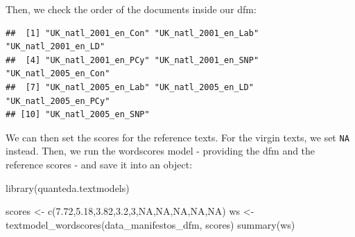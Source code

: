 \documentclass[
]{article}
\newenvironment{Shaded}{\begin{snugshade}}{\end{snugshade}}
\newcommand{\ConstantTok}[1]{\textcolor[rgb]{0.00,0.00,0.00}{#1}}
\newcommand{\DecValTok}[1]{\textcolor[rgb]{0.00,0.00,0.81}{#1}}
\newcommand{\FloatTok}[1]{\textcolor[rgb]{0.00,0.00,0.81}{#1}}
\newcommand{\FunctionTok}[1]{\textcolor[rgb]{0.00,0.00,0.00}{#1}}
\newcommand{\NormalTok}[1]{#1}
\newcommand{\OtherTok}[1]{\textcolor[rgb]{0.56,0.35,0.01}{#1}}
\newcommand{\SpecialCharTok}[1]{\textcolor[rgb]{0.00,0.00,0.00}{#1}}
\begin{document}
Then, we check the order of the documents inside our dfm:

\begin{Shaded}
\end{Shaded}

\begin{verbatim}
##  [1] "UK_natl_2001_en_Con" "UK_natl_2001_en_Lab" "UK_natl_2001_en_LD" 
##  [4] "UK_natl_2001_en_PCy" "UK_natl_2001_en_SNP" "UK_natl_2005_en_Con"
##  [7] "UK_natl_2005_en_Lab" "UK_natl_2005_en_LD"  "UK_natl_2005_en_PCy"
## [10] "UK_natl_2005_en_SNP"
\end{verbatim}

We can then set the scores for the reference texts. For the virgin texts, we set \texttt{NA} instead. Then, we run the wordscores model - providing the dfm and the reference scores - and save it into an object:

\begin{Shaded}
\begin{Highlighting}[]
\FunctionTok{library}\NormalTok{(quanteda.textmodels)}

\NormalTok{scores }\OtherTok{\textless{}{-}} \FunctionTok{c}\NormalTok{(}\FloatTok{7.72}\NormalTok{,}\FloatTok{5.18}\NormalTok{,}\FloatTok{3.82}\NormalTok{,}\FloatTok{3.2}\NormalTok{,}\DecValTok{3}\NormalTok{,}\ConstantTok{NA}\NormalTok{,}\ConstantTok{NA}\NormalTok{,}\ConstantTok{NA}\NormalTok{,}\ConstantTok{NA}\NormalTok{,}\ConstantTok{NA}\NormalTok{)}
\NormalTok{ws }\OtherTok{\textless{}{-}} \FunctionTok{textmodel\_wordscores}\NormalTok{(data\_manifestos\_dfm, scores)}
\FunctionTok{summary}\NormalTok{(ws)}
\end{Highlighting}
\end{Shaded}
\end{document}
